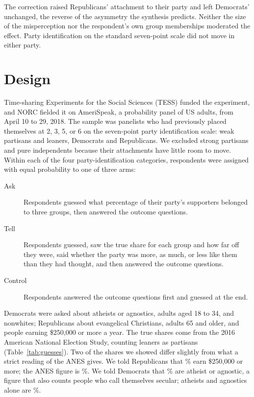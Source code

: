 \documentclass[11pt]{article}
\begin{document}
The correction raised Republicans' attachment to their party and left Democrats' unchanged, the reverse of the asymmetry the synthesis predicts. Neither the size of the misperception nor the respondent's own group memberships moderated the effect. Party identification on the standard seven-point scale did not move in either party.

\section{Design}

Time-sharing Experiments for the Social Sciences (TESS) funded the experiment, and NORC fielded it on AmeriSpeak, a probability panel of US adults, from April 10 to 29, 2018. The sample was \nTotal{} panelists who had previously placed themselves at 2, 3, 5, or 6 on the seven-point party identification scale: weak partisans and leaners, \nDem{} Democrats and \nRep{} Republicans. We excluded strong partisans and pure independents because their attachments have little room to move. Within each of the four party-identification categories, respondents were assigned with equal probability to one of three arms:

\begin{description}
\item[Ask] Respondents guessed what percentage of their party's supporters belonged to three groups, then answered the outcome questions.
\item[Tell] Respondents guessed, saw the true share for each group and how far off they were, said whether the party was more, as much, or less like them than they had thought, and then answered the outcome questions.
\item[Control] Respondents answered the outcome questions first and guessed at the end.
\end{description}

Democrats were asked about atheists or agnostics, adults aged 18 to 34, and nonwhites; Republicans about evangelical Christians, adults 65 and older, and people earning \$250,000 or more a year. The true shares come from the 2016 American National Election Study, counting leaners as partisans (Table~\ref{tab:guesses}). Two of the shares we showed differ slightly from what a strict reading of the ANES gives. We told Republicans that \shownRich\% earn \$250,000 or more; the ANES figure is \anesRich\%. We told Democrats that \shownAtheist\% are atheist or agnostic, a figure that also counts people who call themselves secular; atheists and agnostics alone are \anesAtheistStrict\%.
\end{document}
